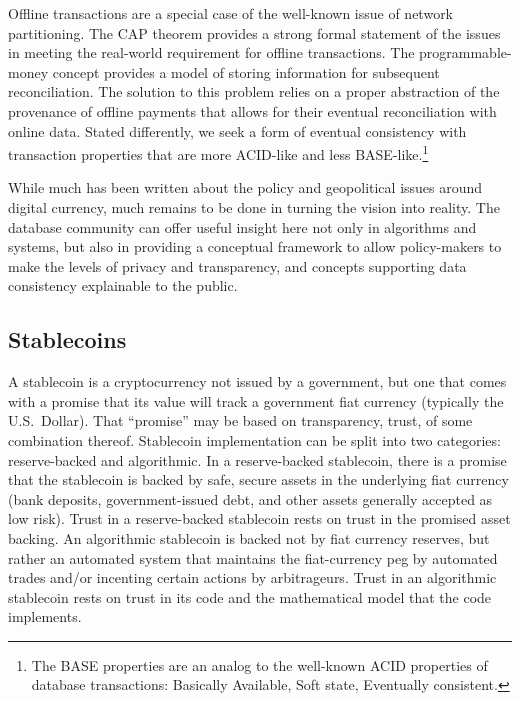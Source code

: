 \documentclass[11pt,dvipdfm]{article}
\begin{document}
Offline transactions are a special case of the well-known issue of network partitioning.  The CAP theorem\cite{cap12} 
provides a strong formal statement of the issues in meeting  the real-world requirement for offline transactions.
The programmable-money concept\cite{Knox} provides a model of storing information for subsequent reconciliation.
The solution to this problem relies on a proper abstraction of the provenance of offline payments that allows
for their eventual reconciliation with online data.  
Stated differently, we seek a form of eventual consistency with transaction properties that are more 
ACID-like and less BASE-like.\footnote{The BASE properties are an analog to the well-known ACID
properties of database transactions: Basically Available, Soft state, Eventually consistent.}

While much has been written about the policy and geopolitical issues around digital currency, much remains
to be done in turning the vision into reality.  
The database community can offer useful insight here not only in algorithms and systems, but also
in providing a conceptual framework to allow policy-makers to make the levels of  privacy and transparency,
and concepts supporting data consistency
explainable to the public.

\subsection{Stablecoins}

A stablecoin is a cryptocurrency not issued by a government, but one that comes with a promise that its value
will track a government fiat currency (typically the U.S.\ Dollar).
That ``promise'' may be based on transparency, trust, of some combination thereof.
Stablecoin implementation can be split into two categories: reserve-backed and algorithmic.
In a reserve-backed stablecoin, there is a promise that the stablecoin is backed by safe, secure assets in
the underlying fiat currency (bank deposits, government-issued debt, and other assets generally accepted as low
risk).  Trust in a reserve-backed stablecoin rests on trust in the promised asset backing.
An algorithmic stablecoin is backed not by fiat currency reserves, but rather an automated system that
maintains the fiat-currency peg by automated trades and/or incenting certain actions by arbitrageurs.
Trust in an algorithmic stablecoin rests on trust in its code  and the mathematical model that
the code implements.
\end{document}
